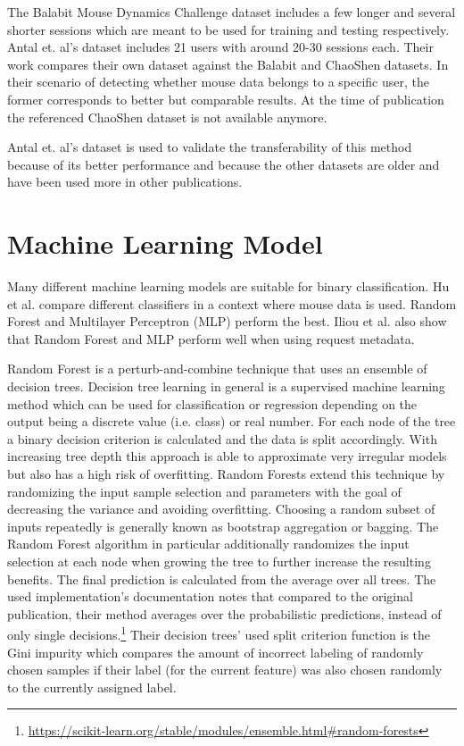 \documentclass[
    fontsize=12pt,
    headings=small,
    parskip=half,           %
    bibliography=totoc,
    numbers=noenddot,       %
    open=any,               %
    final,                   %
    table
]{scrreprt}
\begin{document}
The Balabit Mouse Dynamics Challenge dataset \cite{BALABIT_CHALLENGE} includes a few longer and several shorter sessions which are meant to be used for training and testing respectively.
Antal et. al's dataset \cite{9111596} includes 21 users with around 20-30 sessions each. Their work compares their own dataset against the Balabit and ChaoShen datasets. In their scenario of detecting whether mouse data belongs to a specific user, the former corresponds to better but comparable results.
At the time of publication the referenced ChaoShen dataset is not available anymore.

Antal et. al's dataset is used to validate the transferability of this method because of its better performance and because the other datasets are older and have been used more in other publications.


\section{Machine Learning Model}

Many different machine learning models are suitable for binary classification. Hu et al. \cite{8275816} compare different classifiers in a context where mouse data is used. Random Forest and Multilayer Perceptron (MLP) perform the best.
Iliou et al. \cite{10.1145/3339252.3339267} also show that Random Forest and MLP perform well when using request metadata.

Random Forest\cite{Breiman2001} is a perturb-and-combine technique that uses an ensemble of decision trees. Decision tree learning in general is a supervised machine learning method which can be used for classification or regression depending on the output being a discrete value (i.e. class) or real number. For each node of the tree a binary decision criterion is calculated and the data is split accordingly. With increasing tree depth this approach is able to approximate very irregular models but also has a high risk of overfitting. Random Forests extend this technique by randomizing the input sample selection and parameters with the goal of decreasing the variance and avoiding overfitting. Choosing a random subset of inputs repeatedly is generally known as bootstrap  aggregation or bagging. The Random Forest algorithm in particular additionally randomizes the input selection at each node when growing the tree to further increase the resulting benefits. The final prediction is calculated from the average over all trees. The used implementation's documentation notes that compared to the original publication, their method averages over the probabilistic predictions, instead of only single decisions.\footnote{\url{https://scikit-learn.org/stable/modules/ensemble.html\#random-forests}} Their decision trees' used split criterion function is the Gini impurity which compares the amount of incorrect labeling of randomly chosen samples if their label (for the current feature) was also chosen randomly to the currently assigned label.
\end{document}
